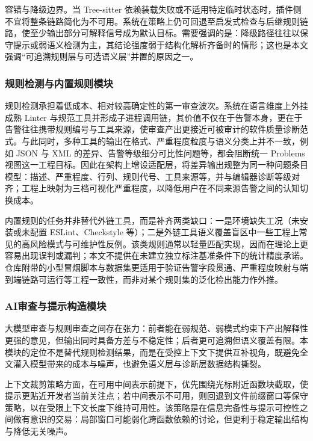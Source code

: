 容错与降级边界。当 Tree-sitter 依赖装载失败或不适用特定临时状态时，插件侧不宜将整条链路简化为不可用。系统在策略上仍可回退至启发式检查与后继规则链路，使至少输出部分可解释信号成为默认目标。需要强调的是：降级路径往往以保守提示或弱语义检测为主，其结论强度弱于结构化解析齐备时的情形；这也是本文强调“可追溯规则层与可选语义层”并置的原因之一。

\subsubsection{规则检测与内置规则模块}

规则检测承担着低成本、相对较高确定性的第一审查波次。系统在语言维度上外挂成熟 Linter 与规范工具并形成子进程调用链，其价值不仅在于告警本身，更在于告警往往携带规则编号与工具来源，使审查产出更接近可被审计的软件质量诊断范式。与此同时，多种工具的输出在格式、严重程度粒度与语义分类上并不一致，例如 JSON 与 XML 的差异、告警等级细分可比性问题等，都会阻断统一 Problems 视图这一工程目标。因此在架构上增设适配层，将差异输出规整为同一种问题条目模型：描述、严重程度、行列、规则代号、工具来源等，并与编辑器诊断等级对齐；工程上映射为三档可视化严重程度，以降低用户在不同来源告警之间的认知切换成本。

内置规则的任务并非替代外链工具，而是补齐两类缺口：一是环境缺失工况（未安装或未配置 ESLint、Checkstyle 等）；二是外链工具语义覆盖盲区中一些工程上常见的高风险模式与可维护性反例。该类规则通常以轻量匹配实现，因而在理论上更容易出现误判或漏判；本文不提供在未建立独立标注基准条件下的统计精度承诺。仓库附带的小型冒烟脚本与数据集更适用于验证告警字段贯通、严重程度映射与端到端链路可运行等工程一致性，而非对某个规则集的泛化检出能力作外推。

\subsubsection{AI审查与提示构造模块}

大模型审查与规则审查之间存在张力：前者能在弱规范、弱模式约束下产出解释性更强的意见，但输出同时具备方差与不稳定性\cite{hou2024llmse}；后者更可追溯但语义覆盖有限。本模块的定位不是替代规则检测结果，而是在受控上下文下提供互补视角，既避免全文灌入模型带来的成本与噪声，也避免语义层与诊断层数据结构撕裂。

上下文裁剪策略方面，在可用中间表示前提下，优先围绕光标附近函数块截取，使提示更贴近开发者当前关注点；若中间表示不可用，则回退到文件前缀窗口等保守策略，以在受限上下文长度下维持可用性。该策略是在信息完备性与提示可控性之间做有意识的交易：局部窗口可能弱化跨函数依赖的讨论，但更利于稳定输出结构与降低无关噪声。

